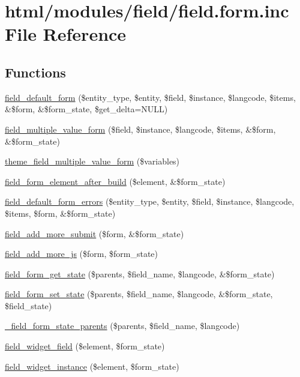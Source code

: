 \hypertarget{field_8form_8inc}{
\section{html/modules/field/field.form.inc File Reference}
\label{field_8form_8inc}
}
\subsection*{Functions}
\begin{DoxyCompactItemize}
\item 
\hyperlink{field_8form_8inc_ac46022d7310dd8d6eb0409e4175e18c0}{field\_\-default\_\-form} (\$entity\_\-type, \$entity, \$field, \$instance, \$langcode, \$items, \&\$form, \&\$form\_\-state, \$get\_\-delta=NULL)
\item 
\hyperlink{field_8form_8inc_a46777a9ee9b54599b953ef7d6fd6b422}{field\_\-multiple\_\-value\_\-form} (\$field, \$instance, \$langcode, \$items, \&\$form, \&\$form\_\-state)
\item 
\hyperlink{group__themeable_ga74b93c09d317f6348b32ad1e6695c61e}{theme\_\-field\_\-multiple\_\-value\_\-form} (\$variables)
\item 
\hyperlink{field_8form_8inc_acf98217acdd07f36d9fa45f6d6d92e0d}{field\_\-form\_\-element\_\-after\_\-build} (\$element, \&\$form\_\-state)
\item 
\hyperlink{field_8form_8inc_a0649a57b5581c7896bcd997aa0e3e172}{field\_\-default\_\-form\_\-errors} (\$entity\_\-type, \$entity, \$field, \$instance, \$langcode, \$items, \$form, \&\$form\_\-state)
\item 
\hyperlink{field_8form_8inc_a39c4e68fe7eac6f151f7c140854d50dc}{field\_\-add\_\-more\_\-submit} (\$form, \&\$form\_\-state)
\item 
\hyperlink{field_8form_8inc_a8e5c072d17551aa6112f4ea27328b9d6}{field\_\-add\_\-more\_\-js} (\$form, \$form\_\-state)
\item 
\hyperlink{field_8form_8inc_a84146d3d086bfc6b242f01c23e552435}{field\_\-form\_\-get\_\-state} (\$parents, \$field\_\-name, \$langcode, \&\$form\_\-state)
\item 
\hyperlink{field_8form_8inc_a8e21a8b058d1a84d91d1a326242e303e}{field\_\-form\_\-set\_\-state} (\$parents, \$field\_\-name, \$langcode, \&\$form\_\-state, \$field\_\-state)
\item 
\hyperlink{field_8form_8inc_aaf5ced1bff5c1580e84b9a7cfbf961c5}{\_\-field\_\-form\_\-state\_\-parents} (\$parents, \$field\_\-name, \$langcode)
\item 
\hyperlink{field_8form_8inc_a71dcef632fc59641eee5238c7c6b335c}{field\_\-widget\_\-field} (\$element, \$form\_\-state)
\item 
\hyperlink{field_8form_8inc_ac72e1f5dacbab488a337f79fe485429f}{field\_\-widget\_\-instance} (\$element, \$form\_\-state)
\end{DoxyCompactItemize}


